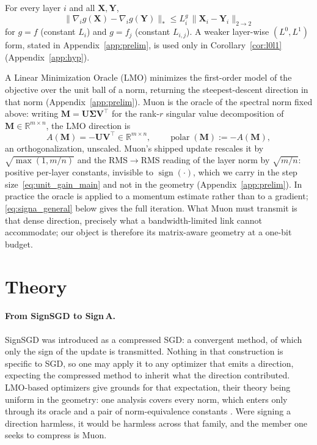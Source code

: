 \begin{assumption}\label{as:2}
For every layer $i$ and all $\mathbf{X},\mathbf{Y}$,
\begin{equation}
\|\nabla_i g(\mathbf{X}) - \nabla_i g(\mathbf{Y})\|_{*} \le L_i^{g}\,\|\mathbf{X}_i - \mathbf{Y}_i\|_{2\to 2}
\end{equation}
for $g = f$ (constant $L_i$) and $g = f_j$ (constant $L_{i,j}$). A weaker layer-wise $(L^0,L^1)$ form, stated in Appendix~\ref{app:prelim}, is used only in Corollary~\ref{cor:l0l1} (Appendix~\ref{app:hyp}).
\end{assumption}

A Linear Minimization Oracle (LMO) minimizes the first-order model of the objective over the unit ball of a norm, returning the steepest-descent direction in that norm (Appendix~\ref{app:prelim}). Muon is the oracle of the spectral norm fixed above: writing $\mathbf{M}=\mathbf{U}\boldsymbol{\Sigma}\mathbf{V}^\top$ for the rank-$r$ singular value decomposition of $\mathbf{M}\in\mathbb{R}^{m\times n}$, the LMO direction is
\begin{equation}
A(\mathbf{M})=-\mathbf{U}\mathbf{V}^\top \in \mathbb{R}^{m\times n},
\qquad \operatorname{polar}(\mathbf{M}):=-A(\mathbf{M}),
\end{equation}
an orthogonalization, unscaled. Muon's shipped update rescales it by $\sqrt{\max(1,m/n)}$ \citep{jordan2024muon} and the RMS$\to$RMS reading of the layer norm by $\sqrt{m/n}$: positive per-layer constants, invisible to $\operatorname{sign}(\cdot)$, which we carry in the step size~\eqref{eq:unit_gain_main} and not in the geometry (Appendix~\ref{app:prelim}). In practice the oracle is applied to a momentum estimate rather than to a gradient; \eqref{eq:signa_general} below gives the full iteration. What Muon must transmit is that dense direction, precisely what a bandwidth-limited link cannot accommodate; our object is therefore its matrix-aware geometry at a one-bit budget.


\section{Theory}\label{sec:theory}
\paragraph{From SignSGD to Sign\,A.} SignSGD was introduced as a compressed SGD: a convergent method, of which only the sign of the update is transmitted. Nothing in that construction is specific to SGD, so one may apply it to any optimizer that emits a direction, expecting the compressed method to inherit what the direction contributed. LMO-based optimizers give grounds for that expectation, their theory being uniform in the geometry: one analysis covers every norm, which enters only through its oracle and a pair of norm-equivalence constants \citep{pethick2025training,kovalev2025understanding,riabinin2025gluon}. Were signing a direction harmless, it would be harmless across that family, and the member one seeks to compress is Muon.

